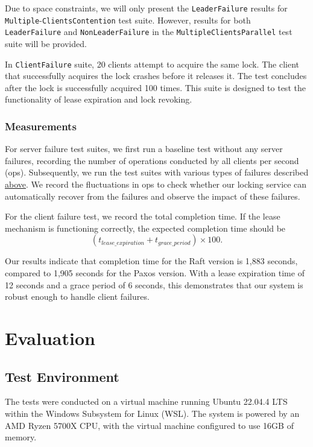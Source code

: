 \documentclass[11pt,a4paper]{article}
\begin{document}
Due to space constraints, we will only present the \verb|LeaderFailure| results for \verb|Multiple|-\verb|ClientsContention| test suite. However, results for both \verb|LeaderFailure| and \verb|NonLeaderFailure| in the \verb|MultipleClientsParallel| test suite will be provided.

In \verb|ClientFailure| suite, 20 clients attempt to acquire the same lock. The client that successfully acquires the lock crashes before it releases it. The test concludes after the lock is successfully acquired 100 times. This suite is designed to test the functionality of lease expiration and lock revoking.

\subsubsection{Measurements}
For server failure test suites, we first run a baseline test without any server failures, recording the number of operations conducted by all clients per second (ops). Subsequently, we run the test suites with various types of failures described \hyperref[failureDescription]{above}. We record the fluctuations in ops to check whether our locking service can automatically recover from the failures and observe the impact of these failures.

For the client failure test, we record the total completion time. If the lease mechanism is functioning correctly, the expected completion time should be
\begin{equation}
(t_{lease\_expiration}+t_{grace\_period})\times100.
\end{equation}

Our results indicate that completion time for the Raft version is 1,883 seconds, compared to 1,905 seconds for the Paxos version. With a lease expiration time of 12 seconds and a grace period of 6 seconds, this demonstrates that our system is robust enough to handle client failures.

\section{Evaluation}\label{sec4}

\subsection{Test Environment}
The tests were conducted on a virtual machine running Ubuntu 22.04.4 LTS within the Windows Subsystem for Linux (WSL). The system is powered by an AMD Ryzen 5700X CPU, with the virtual machine configured to use 16GB of memory.
\end{document}
